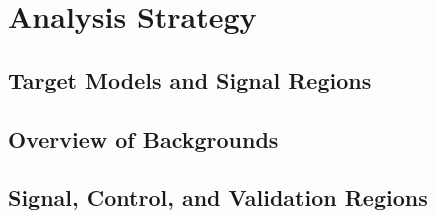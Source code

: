 \chapter{Analysis Strategy}

\section{Target Models and Signal Regions}

\section{Overview of Backgrounds}

\section{Signal, Control, and Validation Regions}
